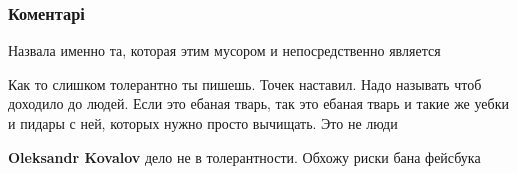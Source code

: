  
 
 
 
 
\subsubsection{Коментарі}
\label{sec:10_08_2021.fb.lysenko_artem.1.farion_biomusor_maguchih.cmt}

\begin{itemize}
 
Назвала именно та, которая этим мусором и непосредственно является

 

Как то слишком толерантно ты пишешь. Точек наставил. Надо называть чтоб доходило
до людей. Если это ебаная тварь, так это ебаная тварь и такие же уебки и пидары с
ней, которых нужно просто вычищать. Это не люди

\begin{itemize}
 
\textbf{Oleksandr Kovalov} дело не в толерантности. Обхожу риски бана фейсбука
\end{itemize}

 

\end{itemize}
